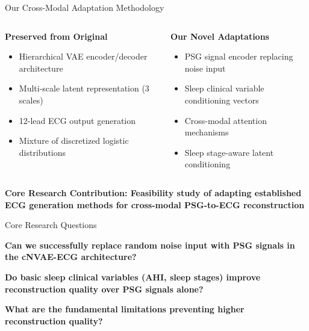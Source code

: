 \documentclass[aspectratio=169,11pt]{beamer}
\newcommand{\highlightbox}[2][tcairemred]{%
  \begin{center}
    \colorbox{#1!20}{\parbox{0.9\textwidth}{\centering\textcolor{#1}{\textbf{#2}}}}
  \end{center}}
\begin{document}
\begin{frame}{Our Cross-Modal Adaptation Methodology}
  \vspace{0.3em}
  \begin{columns}[T]
    \begin{column}{0.5\textwidth}
      \textbf{\textcolor{tcairemblue}{Preserved from Original}}
      \begin{itemize}
        \tiny
        \item Hierarchical VAE encoder/decoder architecture
        \item Multi-scale latent representation (3 scales)
        \item 12-lead ECG output generation
        \item Mixture of discretized logistic distributions
      \end{itemize}
    \end{column}
    \begin{column}{0.5\textwidth}
      \textbf{\textcolor{tcairemred}{Our Novel Adaptations}}
      \begin{itemize}
        \tiny
        \item PSG signal encoder replacing noise input
        \item Sleep clinical variable conditioning vectors
        \item Cross-modal attention mechanisms
        \item Sleep stage-aware latent conditioning
      \end{itemize}
    \end{column}
  \end{columns}
  
  \highlightbox[tcairemred]{Core Research Contribution: Feasibility study of adapting established ECG generation methods for cross-modal PSG-to-ECG reconstruction}
\end{frame}

\begin{frame}{Core Research Questions}
  
      \colorbox{tcairemblue!15}{\parbox{0.95\textwidth}{
    \large
    \textcolor{tcairemblue}{\textbf{Can we successfully replace random noise input with PSG signals in the cNVAE-ECG architecture?}}\\
  }}
  
      \colorbox{tcairemorange!15}{\parbox{0.95\textwidth}{
    \large
    \textcolor{tcairemorange}{\textbf{Do basic sleep clinical variables (AHI, sleep stages) improve reconstruction quality over PSG signals alone?}}\\
}}
    \colorbox{tcairemgreen!15}{\parbox{0.95\textwidth}{
    \large
    \textcolor{tcairemgreen}{\textbf{What are the fundamental limitations preventing higher reconstruction quality?}}


  }}

\end{frame}
\end{document}
